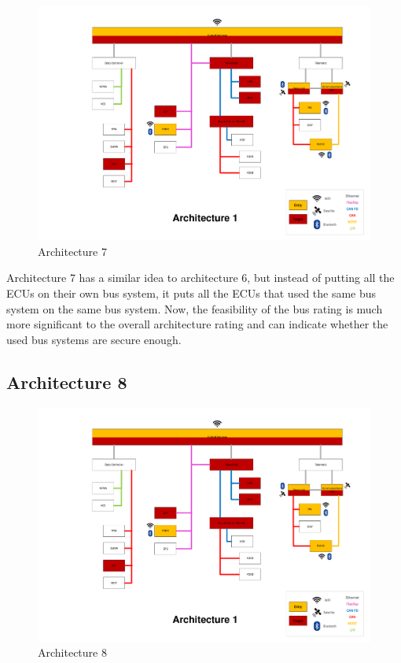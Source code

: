\begin{figure}[h!]
    \caption{Architecture 7}
    \includegraphics[width=\textwidth, page=7]{../Architectures-survey.pdf}
\end{figure}

Architecture 7 has a similar idea to architecture 6, but instead of putting all the ECUs on their own bus system, it puts all the ECUs that used the same bus system on the same bus system.
Now, the feasibility of the bus rating is much more significant to the overall architecture rating and can indicate whether the used bus systems are secure enough.\par



\subsection{Architecture 8}
\label{subsec:arch8}

\begin{figure}[h!]
    \caption{Architecture 8}
    \includegraphics[width=\textwidth, page=8]{../Architectures-survey.pdf}
\end{figure}

